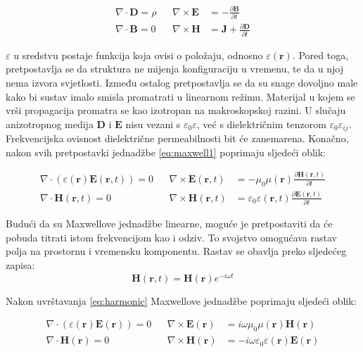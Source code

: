 \documentclass[utf8, seminar]{fer}
\begin{document}
\begin{align} \label{eq:maxwell1}
	\nabla \cdot \mathbf{D} = \rho &&
	\nabla \times \mathbf{E} &=
		- \frac{\partial \mathbf{B}}{\partial t}  \nonumber \\
	\nabla \cdot \mathbf{B} = 0 &&
	\nabla \times \mathbf{H} &=
		\mathbf{J} + \frac{\partial \mathbf{D}}{\partial t}
\end{align}

$\varepsilon$ u sredstvu postaje funkcija koja ovisi o položaju, odnosno
$\varepsilon(\mathbf{r})$. Pored toga, pretpostavlja se da struktura ne mijenja
konfiguraciju u vremenu, te da u njoj nema izvora svjetlosti. Između ostalog
pretpostavlja se da su snage dovoljno male kako bi sustav imalo smisla promatrati
u linearnom režimu.
Materijal u kojem se vrši propagacija promatra se kao izotropan na makroskopskoj
razini. U slučaju anizotropnog medija $\mathbf{D}$ i $\mathbf{E}$ nisu vezani
s $\varepsilon_0 \varepsilon$, već s
dielektričnim tenzorom $\varepsilon_0 \varepsilon_{ij}$. Frekvencijska ovisnost
dielektrične permeabilnosti bit će zanemarena. Konačno, nakon svih pretpostavki
jednadžbe \ref{eq:maxwell1} poprimaju sljedeći oblik:

\begin{align} \label{eq:maxwell2}
	\nabla \cdot (\varepsilon(\mathbf{r}) \mathbf{E}(\mathbf{r}, t)) = 0 &&
	\nabla \times \mathbf{E}(\mathbf{r}, t) &=
		- \mu_0 \mu(\mathbf{r})
		\frac{\partial \mathbf{H}(\mathbf{r}, t)}{\partial t}  \nonumber \\
	\nabla \cdot \mathbf{H}(\mathbf{r}, t) = 0 &&
	\nabla \times \mathbf{H}(\mathbf{r}, t) &=
		\varepsilon_0 \varepsilon(\mathbf{r}, t)
		\frac{\partial \mathbf{E}(\mathbf{r}, t)}{\partial t}
\end{align}

Budući da su Maxwellove jednadžbe linearne, moguće je pretpostaviti da će pobuda
titrati istom frekvencijom kao i odziv. To svojstvo omogućava rastav polja
na prostornu i vremensku komponentu. Rastav se obavlja preko sljedećeg zapisa:
\begin{equation} \label{eq:harmonic}
	\mathbf{H}(\mathbf{r}, t) = \mathbf{H}(\mathbf{r}) e^{-i \omega t}
\end{equation}

Nakon uvrštavanja \ref{eq:harmonic} Maxwellove jednadžbe poprimaju sljedeći
oblik:

\begin{align} \label{eq:maxwell3}
	\nabla \cdot (\varepsilon(\mathbf{r}) \mathbf{E}(\mathbf{r})) = 0 &&
	\nabla \times \mathbf{E}(\mathbf{r}) &=
		i \omega \mu_0 \mu(\mathbf{r})\mathbf{H}(\mathbf{r})  \nonumber \\
	\nabla \cdot \mathbf{H}(\mathbf{r}) = 0 &&
	\nabla \times \mathbf{H}(\mathbf{r}) &=
		- i \omega \varepsilon_0 \varepsilon(\mathbf{r})\mathbf{E}(\mathbf{r})
\end{align}
\end{document}
